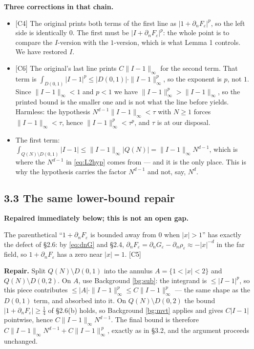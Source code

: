 \documentclass[11pt,reqno]{amsart}
\theoremstyle{plain}
\theoremstyle{definition}
\theoremstyle{plain}
\theoremstyle{definition}
\theoremstyle{remark}
\newcommand{\nd}{\partial_n}
\newcommand{\Ledger}[1]{{\scriptsize\textsf{[#1]}}}
\begin{document}
\begin{expansion}
\textbf{Three corrections in that chain.}
\begin{itemize}[leftmargin=1.4em,itemsep=3pt]
\item \Ledger{C4} The original prints both terms of the first line as
  $|1+\nd F_\varepsilon|^p$, so the left side is identically $0$. The first must be
  $|I+\nd F_\varepsilon|^p$: the whole point is to compare the $I$-version with the
  $1$-version, which is what Lemma 1 controls. We have restored $I$.
\item \Ledger{C6} The original's last line prints $C\|I-1\|_\infty$ for the second
  term. That term is $\int_{D(0,1)}|I-1|^p\le|D(0,1)|\cdot\|I-1\|_\infty^p$, so the
  exponent is $p$, not $1$. Since $\|I-1\|_\infty<1$ and $p<1$ we have
  $\|I-1\|_\infty^p>\|I-1\|_\infty$, so the printed bound is the smaller one and is
  not what the line before yields. Harmless: the hypothesis
  $N^{d-1}\|I-1\|_\infty<\tau$ with $N\ge1$ forces $\|I-1\|_\infty<\tau$, hence
  $\|I-1\|_\infty^p<\tau^p$, and $\tau$ is at our disposal.
\item The first term: $\int_{Q(N)\setminus D(0,1)}|I-1|\le\|I-1\|_\infty|Q(N)|
  =\|I-1\|_\infty N^{d-1}$, which is where the $N^{d-1}$ in \eqref{eq:L2hyp} comes
  from --- and it is the only place. This is why the hypothesis carries the factor
  $N^{d-1}$ and not, say, $N^{d}$.
\end{itemize}
\end{expansion}

\subsection*{3.3 The same lower-bound repair}

\begin{caution}
\textbf{Repaired immediately below; this is not an open gap.}\par\smallskip
The parenthetical ``$1+\nd F_\varepsilon$ is bounded away from $0$ when $|x|>1$''
has exactly the defect of \S2.6: by \eqref{eq:dnG} and \S2.4,
$\nd F_\varepsilon=\nd G_\varepsilon-\nd\rho_\varepsilon\approx-|x|^{-d}$ in the far
field, so $1+\nd F_\varepsilon$ has a zero near $|x|=1$. \Ledger{C5}
\end{caution}

\begin{filled}
\textbf{Repair.} Split $Q(N)\setminus D(0,1)$ into the annulus
$A=\{1<|x|<2\}$ and $Q(N)\setminus D(0,2)$.
On $A$, use Background \ref{bg:sub}: the integrand is $\le|I-1|^p$, so this piece
contributes $\le|A|\cdot\|I-1\|_\infty^p\le C\|I-1\|_\infty^p$ --- the same shape as
the $D(0,1)$ term, and absorbed into it.
On $Q(N)\setminus D(0,2)$ the bound $|1+\nd F_\varepsilon|\ge\frac14$ of \S2.6(b)
holds, so Background \ref{bg:mvt} applies and gives $C|I-1|$ pointwise, hence
$C\|I-1\|_\infty N^{d-1}$.
The final bound is therefore
$C\|I-1\|_\infty N^{d-1}+C\|I-1\|_\infty^{\,p}$, exactly as in \S3.2, and the
argument proceeds unchanged.
\end{filled}
\end{document}
